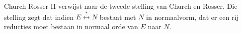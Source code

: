  Church-Rosser II verwijst naar de tweede stelling van Church en Rosser. Die stelling zegt dat indien $E \stackrel{*}{\longleftrightarrow} N$  bestaat met $N$ in normaalvorm, dat er een rij reducties moet bestaan in normaal orde van $E$ naar $N$.